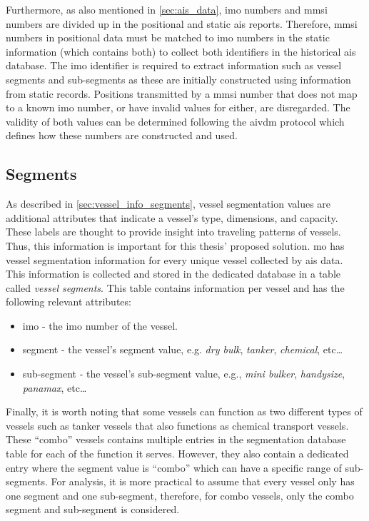 Furthermore, as also mentioned in \cref{sec:ais_data}, \acrshort{imo} numbers and \acrshort{mmsi} numbers are divided up in the positional and static \acrshort{ais} reports. Therefore, \acrshort{mmsi} numbers in positional data must be matched to \acrshort{imo} numbers in the static information (which contains both) to collect both identifiers in the historical \acrshort{ais} database. The \acrshort{imo} identifier is required to extract information such as vessel segments and sub-segments as these are initially constructed using information from static records. Positions transmitted by a \acrshort{mmsi} number that does not map to a known \acrshort{imo} number, or have invalid values for either, are disregarded. The validity of both values can be determined following the \gls{aivdm} protocol which defines how these numbers are constructed and used.

\subsection{Segments}

As described in \cref{sec:vessel_info_segments}, vessel segmentation values are additional attributes that indicate a vessel's type, dimensions, and capacity. These labels are thought to provide insight into traveling patterns of vessels. Thus, this information is important for this thesis' proposed solution. \acrshort{mo} has vessel segmentation information for every unique vessel collected by \acrshort{ais} data. This information is collected and stored in the dedicated database in a table called \textit{vessel segments}. This table contains information per vessel and has the following relevant attributes:

\begin{itemize}
    \item imo - the \acrshort{imo} number of the vessel.
    \item segment - the vessel's segment value, e.g. \textit{dry bulk}, \textit{tanker}, \textit{chemical}, etc\ldots
    \item sub-segment - the vessel's sub-segment value, e.g., \textit{mini bulker}, \textit{handysize}, \textit{panamax}, etc\ldots
\end{itemize}

Finally, it is worth noting that some vessels can function as two different types of vessels such as tanker vessels that also functions as chemical transport vessels. These ``combo'' vessels contains multiple entries in the segmentation database table for each of the function it serves. However, they also contain a dedicated entry where the segment value is ``combo'' which can have a specific range of sub-segments. For analysis, it is more practical to assume that every vessel only has one segment and one sub-segment, therefore, for combo vessels, only the combo segment and sub-segment is considered.

